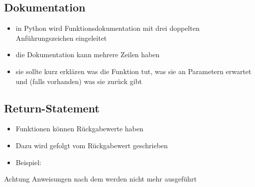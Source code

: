 \subsection{Dokumentation}
\begin{frame}
	\slidehead
	\begin{itemize}
		\item in Python wird Funktionsdokumentation mit drei doppelten Anführungszeichen eingeleitet
		\item die Dokumentation kann mehrere Zeilen haben
		\item sie sollte kurz erklären was die Funktion tut, was sie an Parametern erwartet und (falls vorhanden) was sie zurück gibt
	\end{itemize}
\end{frame}

\subsection{Return-Statement}
\begin{frame}
	\slidehead
	\begin{itemize}
		\item Funktionen können Rückgabewerte haben
		\item Dazu wird  gefolgt vom Rückgabewert geschrieben
		\item Beispiel: 
	\end{itemize}
\end{frame}

\begin{frame}
	\slidehead

	\begin{block}{Achtung}
		Anweisungen nach dem  werden nicht mehr ausgeführt
	\end{block}
\end{frame}

\livecoding



